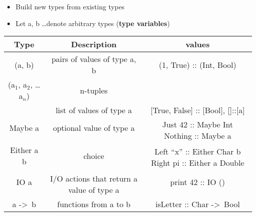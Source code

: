 \begin{itemize}
    \item Build new types from existing types
    \item Let a, b \dots denote arbitrary types (\textbf{type variables})
\end{itemize}

\vspace{9pt}\begin{center}\begin{tabular}{|c|c|c|}\hline
\rowcolor{grau}     Type            & Description                                   & values                        \\\hline
                    (a, b)          & pairs of values of type a, b                  & (1, True) :: (Int, Bool)      \\\hline
                    (a$_1$, a$_2$, \dots a$_n$) & n-tuples                          &                               \\\hline
                    [a]             & list of values of type a                      & [True, False] :: [Bool], []::[a]          \\\hline
                    Maybe a         & optional value of type a                      & \multirow{2}{3.7cm}{Just 42 :: Maybe Int 
                                                                                                         Nothing :: Maybe a}    \\
                                    &                                               &                               \\\hline
                    Either a b      & choice                                        & \multirow{2}{5cm}{Left ``x'' :: Either Char b
                                                                                                     Right pi :: Either a Double}   \\
                                    &                                               &                               \\\hline
                    IO a            & \multirow{2}{4.2cm}{I/O actions that 
                                                            return a value of type a}   & print 42 :: IO ()             \\
                                    &                                               &                               \\\hline
                    a ->\ b& functions from a to b                       & isLetter :: Char ->\ Bool      \\\hline
\end{tabular}\end{center}\vspace{9pt}


